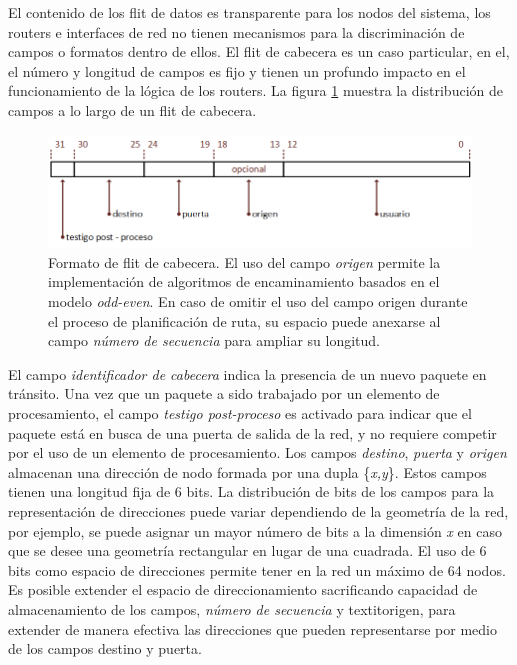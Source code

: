 El contenido de los flit de datos es transparente para los nodos del sistema, los routers e interfaces de red no tienen mecanismos para la discriminación de campos o formatos dentro de ellos. El flit de cabecera es un caso particular, en el, el número y longitud de campos es fijo y tienen un profundo impacto en el funcionamiento de la lógica de los routers. La figura \ref{fig:ch4_flit_cabecera} muestra la distribución de campos a lo largo de un flit de cabecera.


\begin{figure}
	\includegraphics[width=\linewidth]{figures/ch4_flit_cabecera.png}
	\caption
		{	
			Formato de flit de cabecera. El uso del campo \textit{origen} permite la implementación de algoritmos de encaminamiento basados en el modelo \textit{odd-even}. En caso de omitir el uso del campo origen durante el proceso de planificación de ruta, su espacio puede anexarse al campo \textit{número de secuencia} para ampliar su longitud.
		}
	\label{fig:ch4_flit_cabecera}
\end{figure}

 El campo \textit{identificador de cabecera} indica la presencia de un nuevo paquete en tránsito. Una vez que un paquete a sido trabajado por un elemento de procesamiento, el campo \textit{testigo post-proceso} es activado para indicar que el paquete está en busca de una puerta de salida de la red, y no requiere competir por el uso de un elemento de procesamiento. Los campos \textit{destino}, \textit{puerta} y \textit{origen} almacenan una dirección de nodo formada por una dupla \{\textit{x,y}\}. Estos campos tienen una longitud fija de 6 bits. La distribución de bits de los campos para la representación de direcciones puede variar dependiendo de la geometría de la red, por ejemplo, se puede asignar un mayor número de bits a la dimensión \textit{x} en caso que se desee una geometría rectangular en lugar de una cuadrada. El uso de 6 bits como espacio de direcciones permite tener en la red un máximo de 64 nodos. Es posible extender el espacio de direccionamiento sacrificando capacidad de almacenamiento de los campos, \textit{número de secuencia} y textit{origen}, para extender de manera efectiva las direcciones que pueden representarse por medio de los campos destino y puerta.

